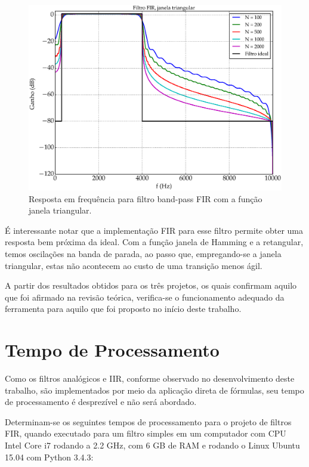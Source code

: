 \begin{figure}[H]
  \centering
  \includegraphics[scale=0.55]{images/plots/bandpass_FIR_triang_window}
  \caption{Resposta em frequência para filtro band-pass FIR com a função janela triangular.}
  \label{fig:bandpass_FIR_triangular}
\end{figure}

É interessante notar que a implementação FIR para esse filtro permite obter uma resposta bem próxima da ideal. Com a função janela de Hamming e a retangular, temos oscilações na banda de parada, ao passo que, empregando-se a janela triangular, estas não acontecem ao custo de uma transição menos ágil.

A partir dos resultados obtidos para os três projetos, os quais confirmam aquilo que foi afirmado na revisão teórica, verifica-se o funcionamento adequado da ferramenta para aquilo que foi proposto no início deste trabalho.

\newpage

\section{Tempo de Processamento}
Como os filtros analógicos e IIR, conforme observado no desenvolvimento deste trabalho, são implementados por meio da aplicação direta de fórmulas, seu tempo de processamento é desprezível e não será abordado. 

Determinam-se os seguintes tempos de processamento para o projeto de filtros FIR, quando executado para um filtro simples em um computador com CPU Intel Core i7 rodando a 2.2 GHz, com 6 GB de RAM e rodando o Linux Ubuntu 15.04 com Python 3.4.3:

